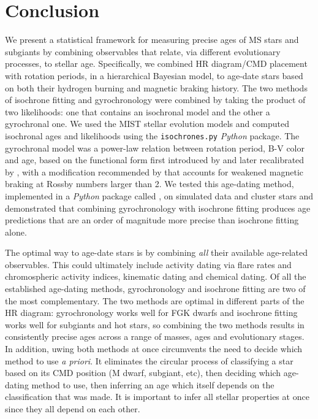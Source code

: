 \section{Conclusion}
\label{section:conclusion}

We present a statistical framework for measuring precise ages of MS stars and
subgiants by combining observables that relate, via different evolutionary
processes, to stellar age.
Specifically, we combined HR diagram/CMD placement with rotation periods, in a
hierarchical Bayesian model, to age-date stars based on both their hydrogen
burning and magnetic braking history.
The two methods of isochrone fitting and gyrochronology were combined by
taking the product of two likelihoods: one that contains an isochronal model
and the other a gyrochronal one.
We used the MIST stellar evolution models and computed isochronal ages and
likelihoods using the {\tt isochrones.py} {\it Python} package.
The gyrochronal model was a power-law relation between rotation period, B-V
color and age, based on the functional form first introduced by
\citet{barnes2003} and later recalibrated by \citet{angus2015}, with a
modification recommended by \citet{vansaders2016} that accounts for weakened
magnetic braking at Rossby numbers larger than 2.
We tested this age-dating method, implemented in a {\it Python} package called
\sd, on simulated data and cluster stars and demonstrated that combining
gyrochronology with isochrone fitting produces age predictions that are an
order of magnitude more precise than isochrone fitting alone.

The optimal way to age-date stars is by combining {\it all} their available
age-related observables.
This could ultimately include activity dating via flare rates and
chromospheric activity indices, kinematic dating and chemical dating.
Of all the established age-dating methods, gyrochronology and isochrone
fitting are two of the most complementary.
The two methods are optimal in different parts of the HR diagram:
gyrochronology works well for FGK dwarfs and isochrone fitting works well for
subgiants and hot stars, so combining the two methods results in consistently
precise ages across a range of masses, ages and evolutionary stages.
In addition, uwing both methods at once circumvents the need to decide which
method to use {\it a priori}.
It eliminates the circular process of classifying a star based on its CMD
position (M dwarf, subgiant, etc), then deciding which age-dating method to
use, then inferring an age which itself depends on the classification that was
made.
It is important to infer all stellar properties at once since they all depend
on each other.

